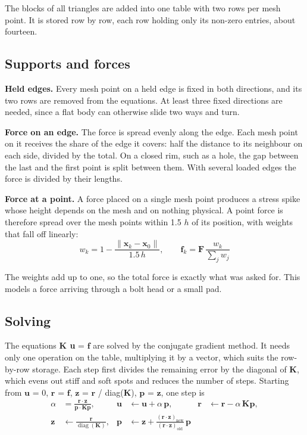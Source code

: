 \documentclass[11pt,a4paper]{article}
\begin{document}
The blocks of all triangles are added into one table with two rows per mesh point. It is stored row by row, each row holding only its non-zero entries, about fourteen. 

\subsection{Supports and forces}
 

\textbf{Held edges.} Every mesh point on a held edge is fixed in both directions, and its two rows are removed from the equations. At least three fixed directions are needed, since a flat body can otherwise slide two ways and turn. 

\textbf{Force on an edge.} The force is spread evenly along the edge. Each mesh point on it receives the share of the edge it covers: half the distance to its neighbour on each side, divided by the total. On a closed rim, such as a hole, the gap between the last and the first point is split between them. With several loaded edges the force is divided by their lengths. 

\textbf{Force at a point.} A force placed on a single mesh point produces a stress spike whose height depends on the mesh and on nothing physical. A point force is therefore spread over the mesh points within 1.5 $h$ of its position, with weights that fall off linearly: 
\begin{equation}
w_k = 1 - \frac{\lVert \mathbf{x}_k - \mathbf{x}_0 \rVert}{1.5\,h}, \qquad \mathbf{f}_k = \mathbf{F}\,\frac{w_k}{\sum_j w_j}
\end{equation}
 

The weights add up to one, so the total force is exactly what was asked for. This models a force arriving through a bolt head or a small pad. 

\subsection{Solving}
 

The equations \textbf{K u} = $\mathbf{f}$ are solved by the conjugate gradient method. It needs only one operation on the table, multiplying it by a vector, which suits the row-by-row storage. Each step first divides the remaining error by the diagonal of $\mathbf{K}$, which evens out stiff and soft spots and reduces the number of steps. Starting from $\mathbf{u}$ = 0, $\mathbf{r}$ = $\mathbf{f}$, $\mathbf{z}$ = $\mathbf{r}$ / diag($\mathbf{K}$), $\mathbf{p}$ = $\mathbf{z}$, one step is 
\begin{equation}
\begin{aligned} \alpha &= \frac{\mathbf{r}\cdot\mathbf{z}}{\mathbf{p}\cdot\mathbf{K}\mathbf{p}}, & \mathbf{u} &\leftarrow \mathbf{u} + \alpha\,\mathbf{p}, & \mathbf{r} &\leftarrow \mathbf{r} - \alpha\,\mathbf{K}\mathbf{p}, \\ \mathbf{z} &\leftarrow \frac{\mathbf{r}}{\operatorname{diag}(\mathbf{K})}, & \mathbf{p} &\leftarrow \mathbf{z} + \frac{(\mathbf{r}\cdot\mathbf{z})_{\mathrm{new}}}{(\mathbf{r}\cdot\mathbf{z})_{\mathrm{old}}}\,\mathbf{p} \end{aligned}
\end{equation}
 
\end{document}
